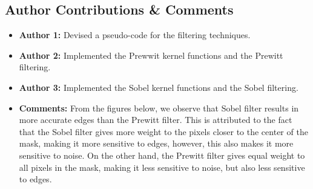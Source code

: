 \documentclass[11pt,a4paper]{article}
\begin{document}
\subsection*{Author Contributions \& Comments}
\begin{itemize}[itemsep=-1ex, topsep=0pt, leftmargin=1em]
    \color{RoyalBlue}\item \textbf{Author 1:} \color{black}{--} Devised a pseudo-code for the filtering techniques.
          \color{RoyalBlue}\item \textbf{Author 2:} \color{black}{--} Implemented the Prewwit kernel functions and the Prewitt filtering.
          \color{RoyalBlue}\item \textbf{Author 3:} \color{black}{--} Implemented the Sobel kernel functions and the Sobel filtering.
    \item \textbf{Comments:} From the figures below, we observe that Sobel filter results in more accurate edges than the Prewitt filter. This is attributed to the fact that the Sobel filter gives more weight to the pixels closer to the center of the mask, making it more sensitive to edges, however, this also makes it more sensitive to noise. On the other hand, the Prewitt filter gives equal weight to all pixels in the mask, making it less sensitive to noise, but also less sensitive to edges.
\end{itemize}
\end{document}
